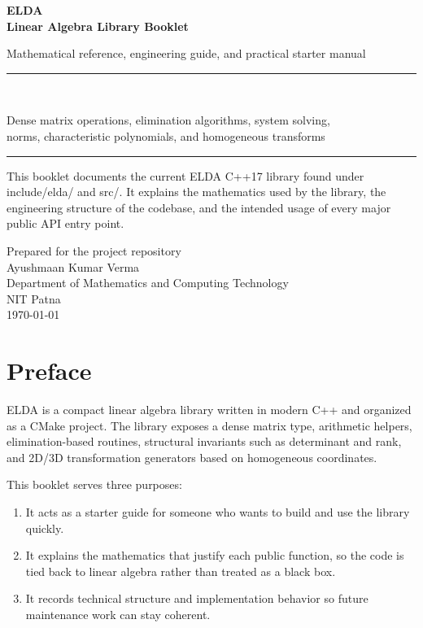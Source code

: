 \documentclass[11pt,a4paper,openany]{book}
\def\code#1{#1}%
\def\ELDA{ELDA}%
\newcommand{\ELDA}{\textsc{ELDA}}
\DeclareRobustCommand{\code}[1]{\texttt{\detokenize{#1}}}
\begin{document}
\begin{titlepage}
    \centering
    \vspace*{2cm}
    {\Huge\bfseries\color{eldaBlue} ELDA \\[0.35cm]}
    {\LARGE\bfseries Linear Algebra Library Booklet \\[0.8cm]}
    {\large Mathematical reference, engineering guide, and practical starter manual\par}
    \vfill
    \rule{0.82\textwidth}{1.4pt}\\[0.5cm]
    {\Large\color{eldaSlate} Dense matrix operations, elimination algorithms, system solving, \\[0.15cm]
    norms, characteristic polynomials, and homogeneous transforms\par}
    \rule{0.82\textwidth}{1.4pt}
    \vfill
    \begin{minipage}{0.82\textwidth}
        \centering
        \begin{techbox}
            This booklet documents the current ELDA C++17 library found under \code{include/elda/} and \code{src/}. It explains the mathematics used by the library, the engineering structure of the codebase, and the intended usage of every major public API entry point.
        \end{techbox}
    \end{minipage}
    \vfill
    {\large Prepared for the project repository}\\[0.15cm]
    {\large Ayushmaan Kumar Verma}\\[0.08cm]
    {\normalsize Department of Mathematics and Computing Technology}\\[0.08cm]
    {\normalsize NIT Patna}\\[0.2cm]
    {\large \today}
\end{titlepage}

\frontmatter

\chapter*{Preface}
\ELDA{} is a compact linear algebra library written in modern C++ and organized as a CMake project. The library exposes a dense matrix type, arithmetic helpers, elimination-based routines, structural invariants such as determinant and rank, and 2D/3D transformation generators based on homogeneous coordinates.

This booklet serves three purposes:
\begin{enumerate}[label=\arabic*.]
    \item It acts as a starter guide for someone who wants to build and use the library quickly.
    \item It explains the mathematics that justify each public function, so the code is tied back to linear algebra rather than treated as a black box.
    \item It records technical structure and implementation behavior so future maintenance work can stay coherent.
\end{enumerate}
\end{document}
